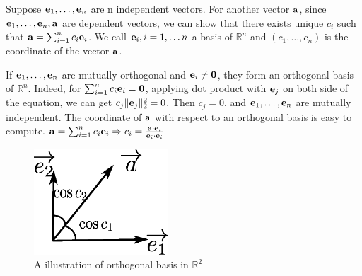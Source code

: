 Suppose $\mathbf{e}_1, \dots, \mathbf{e}_n$ are n independent vectors. For another vector $\mathbf{a}$, since
$\mathbf{e}_1, \dots, \mathbf{e}_n, \mathbf{a}$ are dependent vectors, we can show that there exists unique $c_i$ such that
$\mathbf{a} = \sum_{i=1}^n c_i \mathbf{e}_i$. We call $\mathbf{e}_i, i=1,\dots n$ a basis of $\mathbb{R}^n$ and $(c_1, \dots, c_n)$ is the coordinate of the vector $\mathbf{a}$.

If $\mathbf{e}_1, \dots, \mathbf{e}_n$ are mutually orthogonal and $\mathbf{e}_i \neq \mathbf{0}$, they form an orthogonal basis of $\mathbb{R}^n$. Indeed,  for $\sum_{i=1}^n c_i \mathbf{e}_i = \mathbf{0}$, applying dot product with $\mathbf{e}_j$ on both side of the equation, we can get $ c_j \lVert\mathbf{e}_j\rVert_2^2 = 0 $. Then $c_j = 0$. and $\mathbf{e}_1, \dots, \mathbf{e}_n$ are mutually independent. The coordinate of $\mathbf{a}$ with respect to an orthogonal basis is easy to compute. $\mathbf{a} = \sum_{i=1}^n c_i \mathbf{e}_i \Rightarrow c_i = \frac{\mathbf{a}\cdot \mathbf{e}_i}{\mathbf{e}_i\cdot \mathbf{e}_i}$
\begin{figure}[!ht]
	\centering
	\includegraphics[width=5cm]{orthogonal_basis.eps}
	\caption{A illustration of orthogonal basis in $\mathbb{R}^2$}
\end{figure}

